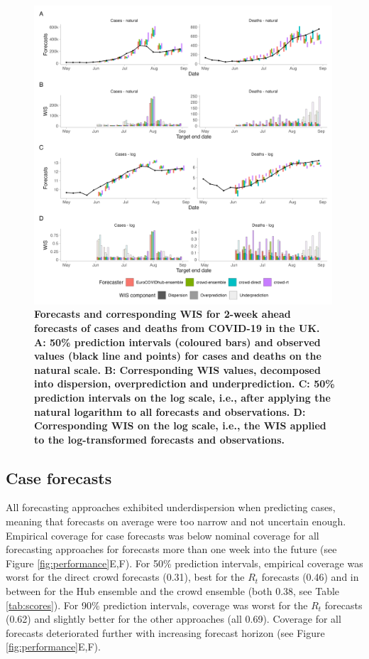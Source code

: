 \documentclass[10pt,a4paper,twocolumn]{article}
\begin{document}
\begin{figure}
\centering
\includegraphics[width=0.99\textwidth]{../output/figures/scores-and-forecasts.png}
\caption{\bf{Forecasts and corresponding WIS for 2-week ahead forecasts of cases and deaths from COVID-19 in the UK.} A: 50\% prediction intervals (coloured bars) and observed values (black line and points) for cases and deaths on the natural scale. B: Corresponding WIS values, decomposed into dispersion, overprediction and underprediction. C: 50\% prediction intervals on the log scale, i.e., after applying the natural logarithm to all forecasts and observations. D: Corresponding WIS on the log scale, i.e., the WIS applied to the log-transformed forecasts and observations.} 
\label{fig:forecasts-scores} 
\end{figure}

\subsection*{Case forecasts}

All forecasting approaches exhibited underdispersion when predicting cases, meaning that forecasts on average were too narrow and not uncertain enough. Empirical coverage for case forecasts was below nominal coverage for all forecasting approaches for forecasts more than one week into the future (see Figure \ref{fig:performance}E,F). 
For 50\% prediction intervals, empirical coverage was worst for the direct crowd forecasts (0.31), best for the $R_t$ forecasts (0.46) and in between for the Hub ensemble and the crowd ensemble (both 0.38, see Table \ref{tab:scores}). For 90\% prediction intervals, coverage was worst for the $R_t$ forecasts (0.62) and slightly better for the other approaches (all 0.69). Coverage for all forecasts deteriorated further with increasing forecast horizon (see Figure \ref{fig:performance}E,F). 
\end{document}
